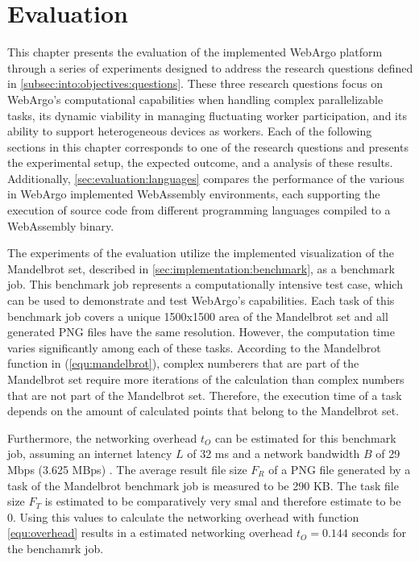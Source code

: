 \chapter{Evaluation}
\label{ch:evaluation}
This chapter presents the evaluation of the implemented WebArgo platform through a series of experiments designed to address the research questions defined in \autoref{subsec:into:objectives:questions}. These three research questions focus on WebArgo's computational capabilities when handling complex parallelizable tasks, its dynamic viability in managing fluctuating worker participation, and its ability to support heterogeneous devices as workers. Each of the following sections in this chapter corresponds to one of the research questions and presents the experimental setup, the expected outcome, and a analysis of these results. Additionally, \autoref{sec:evaluation:languages} compares the performance of the various in WebArgo implemented WebAssembly environments, each supporting the execution of source code from different programming languages compiled to a WebAssembly binary.

The experiments of the evaluation utilize the implemented visualization of the Mandelbrot set, described in \autoref{sec:implementation:benchmark}, as a benchmark job. This benchmark job represents a computationally intensive test case, which can be used to demonstrate and test WebArgo's capabilities. Each task of this benchmark job covers a unique 1500x1500 area of the Mandelbrot set and all generated \acs{PNG} files have the same resolution. However, the computation time varies significantly among each of these tasks. According to the Mandelbrot function in (\ref{equ:mandelbrot}), complex numberers that are part of the Mandelbrot set require more iterations of the calculation than complex numbers that are not part of the Mandelbrot set. Therefore, the execution time of a task depends on the amount of calculated points that belong to the Mandelbrot set.

Furthermore, the networking overhead $t_{O}$ can be estimated for this benchmark job, assuming an internet latency $L$ of 32 ms \cite{backend:latency} and a network bandwidth $B$ of 29 Mbps (3.625 MBps) \cite{backend:latency}. The average result file size $F_{R}$ of a \acs{PNG} file generated by a task of the Mandelbrot benchmark job is measured to be 290 KB. The task file size $F_{T}$ is estimated to be comparatively very smal and therefore estimate to be 0. Using this values to calculate the networking overhead with function \eqref{equ:overhead} results in a estimated networking overhead $t_{O} = 0.144$ seconds for the benchamrk job. 


